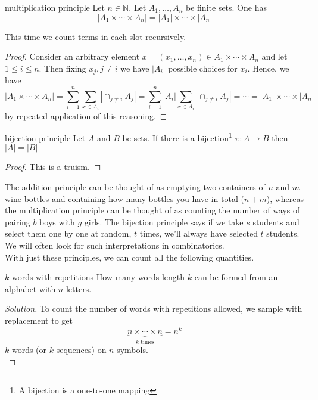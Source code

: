 \documentclass{article}
\begin{document}
\begin{theorem}[]{multiplication principle}
    Let $n \in \mathbb{N}$. Let $A_1, \dots, A_n$ be finite sets. One has
    \[|A_1 \times \cdots \times A_n| = |A_1| \times \cdots \times |A_n|\]
\end{theorem}

This time we count terms in each slot recursively.

\begin{proof}
    Consider an arbitrary element $x = (x_1, \dots, x_n) \in A_1 \times \cdots \times A_n$ and let $1 \leq i \leq n$. Then fixing $x_j, j \neq i$
    we have $|A_i|$ possible choices for $x_i$. Hence, we have 
    \[|A_1 \times \cdots \times A_n| = \sum_{i=1}^n\sum_{x \in A_i}\left|\cap_{j \neq i}A_j\right| 
    = \sum_{i=1}^n |A_i|\sum_{x \in A_i}\left|\cap_{j \neq i}A_j\right| = \cdots = |A_1| \times \cdots \times |A_n|\]
    by repeated application of this reasoning.
\end{proof}

\begin{theorem}[]{bijection principle}
    Let $A$ and $B$ be sets. If there is a bijection\footnote{A bijection is a one-to-one mapping} $\pi: A \to B$ then $|A| = |B|$
\end{theorem}

\begin{proof}
    This is a truism. 
\end{proof}

The addition principle can be thought of as emptying two containers of $n$ and $m$ wine bottles and containing how many bottles you have 
in total ($n+m$), whereas the multiplication principle can be thought of as counting the number of ways of pairing $b$ boys with $g$ girls. 
The bijection principle says if we take $s$ students and select them one by one at random, $t$ times, we'll always have selected $t$ students. 
We will often look for such interpretations in combinatorics. \\

With just these principles, we can count all the following quantities. 

\begin{problem}[]{$k$-words with repetitions}
    How many words length $k$ can be formed from an alphabet with $n$ letters.
\end{problem}

\begin{proof}[Solution]
    To count the number of words with repetitions allowed, we sample with replacement to get
    \[\underbrace{n \times \cdots \times n}_{k \text{ times}} = n^k\]
    $k$-words (or $k$-sequences) on $n$ symbols. \\
\end{proof}
\end{document}
